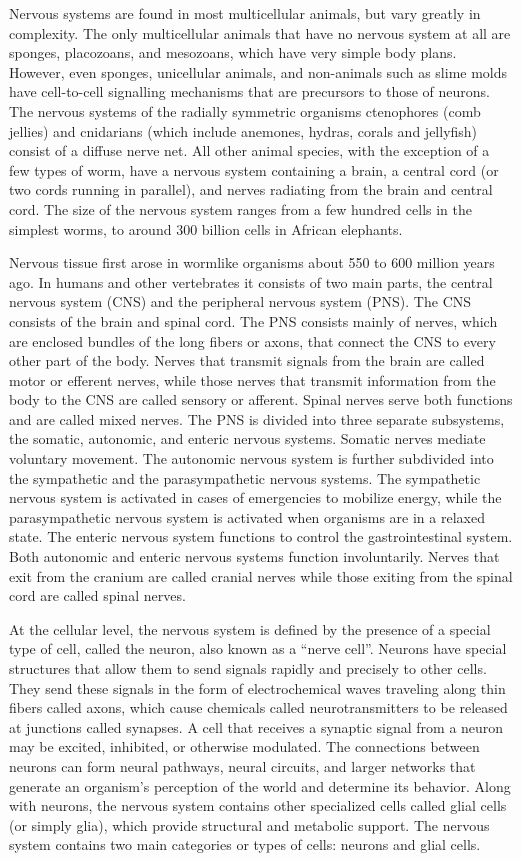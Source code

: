 \documentclass[]{book}
\begin{document}
Nervous systems are found in most multicellular animals, but vary greatly in complexity. The only multicellular animals that have no nervous system at all are sponges, placozoans, and mesozoans, which have very simple body plans. However, even sponges, unicellular animals, and non-animals such as slime molds have cell-to-cell signalling mechanisms that are precursors to those of neurons. The nervous systems of the radially symmetric organisms ctenophores (comb jellies) and cnidarians (which include anemones, hydras, corals and jellyfish) consist of a diffuse nerve net. All other animal species, with the exception of a few types of worm, have a nervous system containing a brain, a central cord (or two cords running in parallel), and nerves radiating from the brain and central cord. The size of the nervous system ranges from a few hundred cells in the simplest worms, to around 300 billion cells in African elephants.

Nervous tissue first arose in wormlike organisms about 550 to 600 million years ago. In humans and other vertebrates it consists of two main parts, the central nervous system (CNS) and the peripheral nervous system (PNS). The CNS consists of the brain and spinal cord. The PNS consists mainly of nerves, which are enclosed bundles of the long fibers or axons, that connect the CNS to every other part of the body. Nerves that transmit signals from the brain are called motor or efferent nerves, while those nerves that transmit information from the body to the CNS are called sensory or afferent. Spinal nerves serve both functions and are called mixed nerves. The PNS is divided into three separate subsystems, the somatic, autonomic, and enteric nervous systems. Somatic nerves mediate voluntary movement. The autonomic nervous system is further subdivided into the sympathetic and the parasympathetic nervous systems. The sympathetic nervous system is activated in cases of emergencies to mobilize energy, while the parasympathetic nervous system is activated when organisms are in a relaxed state. The enteric nervous system functions to control the gastrointestinal system. Both autonomic and enteric nervous systems function involuntarily. Nerves that exit from the cranium are called cranial nerves while those exiting from the spinal cord are called spinal nerves.

At the cellular level, the nervous system is defined by the presence of a special type of cell, called the neuron, also known as a ``nerve cell''. Neurons have special structures that allow them to send signals rapidly and precisely to other cells. They send these signals in the form of electrochemical waves traveling along thin fibers called axons, which cause chemicals called neurotransmitters to be released at junctions called synapses. A cell that receives a synaptic signal from a neuron may be excited, inhibited, or otherwise modulated. The connections between neurons can form neural pathways, neural circuits, and larger networks that generate an organism's perception of the world and determine its behavior. Along with neurons, the nervous system contains other specialized cells called glial cells (or simply glia), which provide structural and metabolic support.
The nervous system contains two main categories or types of cells: neurons and glial cells.
\end{document}
